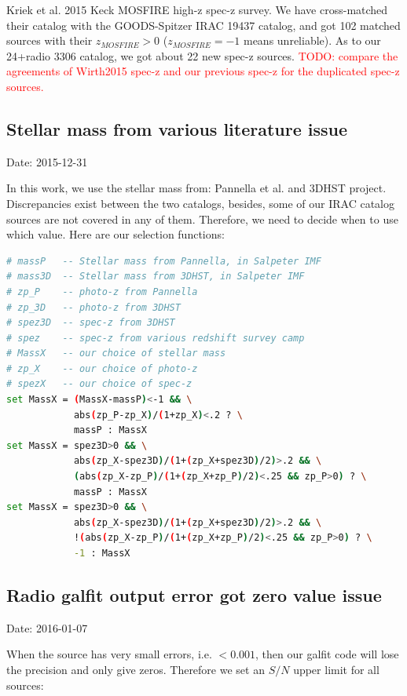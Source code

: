 \documentclass[11pt,a4paper]{article}
\begin{document}
Kriek et al. 2015 Keck MOSFIRE high-z spec-z survey. We have cross-matched their catalog with the GOODS-Spitzer IRAC 19437 catalog, and got 102 matched sources with their $z_{MOSFIRE}>0$ ($z_{MOSFIRE}=-1$ means unreliable). As to our 24+radio 3306 catalog, we got about 22 new spec-z sources. \textcolor{red}{TODO: compare the agreements of Wirth2015 spec-z and our previous spec-z for the duplicated spec-z sources.}


\subsection{Stellar mass from various literature issue}

\textcolor{green!90!black!60!orange}{Date: 2015-12-31}

In this work, we use the stellar mass from: Pannella et al. and 3DHST project. Discrepancies exist between the two catalogs, besides, some of our IRAC catalog sources are not covered in any of them. Therefore, we need to decide when to use which value. Here are our selection functions:

\begin{lstlisting}[language=bash]
# massP   -- Stellar mass from Pannella, in Salpeter IMF
# mass3D  -- Stellar mass from 3DHST, in Salpeter IMF
# zp_P    -- photo-z from Pannella
# zp_3D   -- photo-z from 3DHST
# spez3D  -- spec-z from 3DHST
# spez    -- spec-z from various redshift survey camp
# MassX   -- our choice of stellar mass
# zp_X    -- our choice of photo-z
# spezX   -- our choice of spec-z
set MassX = (MassX-massP)<-1 && \
            abs(zp_P-zp_X)/(1+zp_X)<.2 ? \
            massP : MassX 
set MassX = spez3D>0 && \
            abs(zp_X-spez3D)/(1+(zp_X+spez3D)/2)>.2 && \
            (abs(zp_X-zp_P)/(1+(zp_X+zp_P)/2)<.25 && zp_P>0) ? \
            massP : MassX
set MassX = spez3D>0 && \
            abs(zp_X-spez3D)/(1+(zp_X+spez3D)/2)>.2 && \
            !(abs(zp_X-zp_P)/(1+(zp_X+zp_P)/2)<.25 && zp_P>0) ? \
            -1 : MassX
\end{lstlisting}


\subsection{Radio galfit output error got zero value issue}

\textcolor{green!90!black!60!orange}{Date: 2016-01-07}

When the source has very small errors, i.e. $<0.001$, then our galfit code will lose the precision and only give zeros. Therefore we set an $S/N$ upper limit for all sources:
\end{document}
